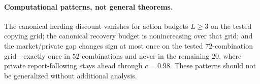 \documentclass[11pt]{article}
\theoremstyle{definition}
\theoremstyle{remark}
\newcommand{\1}{\mathbf{1}}
\begin{document}
\paragraph{Computational patterns, not general theorems.}
The canonical herding discount vanishes for action budgets $L\ge3$ on the tested copying grid; the canonical recovery budget is nonincreasing over that grid; and the market/private gap changes sign at most once on the tested $72$-combination grid---exactly once in $52$ combinations and never in the remaining $20$, where private report-following stays ahead through $c=0.98$. These patterns should not be generalized without additional analysis.
\end{document}
